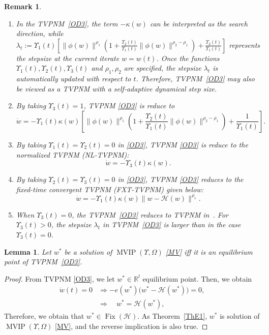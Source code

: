 \documentclass{article}
\theoremstyle{plain}%
\newtheorem{lemma}{Lemma}[section]%
\newtheorem{remark}{Remark}%
\theoremstyle{thmstyletwo}%
\theoremstyle{thmstylethree}%
\begin{document}
\begin{remark}
\begin{enumerate}
    \item In the TVPNM~\eqref{OD3}, the term $-\kappa(w)$ can be interpreted as the search direction, while $\lambda_t := \Upsilon_1(t)\left[\|\phi(w)\|^{\rho_1}\left(1 + \frac{\Upsilon_2(t)}{\Upsilon_1(t)}\|\phi(w)\|^{\rho_2-\rho_1}\right) + \frac{\Upsilon_3(t)}{\Upsilon_1(t)}\right]$
represents the stepsize at the current iterate $w= w(t)$. Once the functions $\Upsilon_1(t),\Upsilon_2(t),\Upsilon_3(t)$ and $\rho_1,\rho_2$ are specified, the stepsize $\lambda_t$ is automatically updated with respect to $t$. Therefore, TVPNM~\eqref{OD3} may also be viewed as a TVPNM with a self-adaptive dynamical step size.\\
\item By taking  $\Upsilon_3(t) = 1$, TVPNM \eqref{OD3} is reduce to
\[
\dot{w} = -\Upsilon_1(t) \kappa(w) \left[ \|\phi(w)\|^{\rho_1} \left( 1 + \frac{\Upsilon_2(t)}{\Upsilon_1(t)} \|\phi(w)\|^{\rho_2 - \rho_1} \right) + \frac{1}{\Upsilon_1(t)} \right].
\]
\item By taking $\Upsilon_1(t) = \Upsilon_2(t) = 0$ in \eqref{OD3}, TVPNM \eqref{OD3} is reduce to the normalized TVPNM (NL-TVPNM):
\begin{equation}
\dot{w} = -\Upsilon_3(t)\kappa(w).
\end{equation}
\item By taking $\Upsilon_2(t) = \Upsilon_3(t) = 0$ in \eqref{OD3}, TVPNM \eqref{OD3} reduces to the fixed-time convergent TVPNM (FXT-TVPNM) given below:
\begin{equation}\label{ODE4}
\dot{w} = -\Upsilon_1(t) \kappa(w) \|w -\mathcal{H}(w)\|^{\rho_1}. 
\end{equation}
\item When $\Upsilon_3(t) = 0$, the TVPNM~\eqref{OD3} reduces to TVPNM in~\cite{20}. For $\Upsilon_3(t) > 0$, the stepsize $\lambda_t$ in TVPNM~\eqref{OD3} is larger than in the case $\Upsilon_3(t) = 0$.\\
\end{enumerate}
\end{remark}

\begin{lemma}\label{Cor5.1}
Let \(w^*\) be a solution of \(\operatorname{MVIP}(\Upsilon, \Omega )\) \eqref{MV} iff it is an equilibrium point of  TVPNM~\eqref{OD3}.
\end{lemma}

\begin{proof}
From TVPNM \eqref{OD3}, we let $w^*\in \mathbb{R}^{l}$  equilibrium point. Then, we obtain 
\begin{align*}
   \dot{w}(t) = 0 
&\Rightarrow 
-e(w^*)\bigl(w^* -\mathcal{H}(w^*)\bigr) = 0, \\
&\Rightarrow \quad w^* =\mathcal{H}(w^*),
\end{align*}
Therefore, we obtain that \(w^* \in \operatorname{Fix}(\mathcal{H})\). As Theorem~\eqref{ThE1}, \(w^*\) is solution of \(\operatorname{MVIP}(\Upsilon, \Omega )\) \eqref{MV}, and the reverse implication is also true.
\end{proof}
\end{document}
